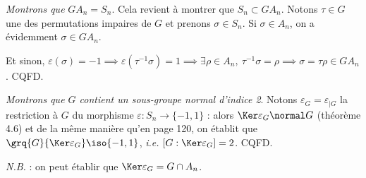 
\emph{Montrons que }$GA_n = S_n$. Cela revient à montrer que $S_n  \subset G A_n$.
Notons $\tau\in G$ une des permutations impaires de $G$ et prenons $\sigma\in S_n$. Si $\sigma\in A_n$, on a évidemment $\sigma\in GA_n$.

Et sinon, $\varepsilon(\sigma) = -1 \implies \varepsilon(\tau^{-1} \sigma) = 1 \implies \exists \rho \in A_n,~ \tau^{-1} \sigma = \rho \implies \sigma = \tau \rho \in GA_n$. CQFD.

\emph{Montrons que $G$ contient un sous-groupe normal d'indice 2}.  Notons $\varepsilon_G = \varepsilon_{\mid G}$ la restriction à $G$ du morphisme $\varepsilon\colon S_n\to \{-1,1\}$ : alors $ \Ker \varepsilon_G \normal G$ (théorème 4.6) et de la même manière qu'en page 120, on établit que $\grq{G}{\Ker \varepsilon_G}\iso  \{-1,1\}$, \textit{i.e.} $[G:\Ker \varepsilon_G] = 2$. CQFD.

\textit{N.B.} : on peut établir que $\Ker \varepsilon_G = G\cap A_n$.
